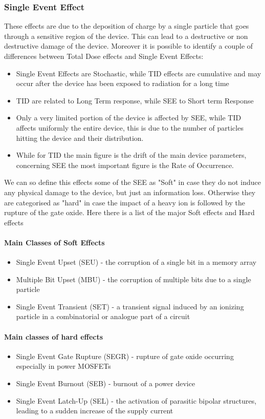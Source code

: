 \documentclass[./dissertation.tex]{subfiles}
\begin{document}
\subsubsection{Single Event Effect}
These effects are due to the deposition of charge by a single particle that goes through a sensitive region of the device. This can lead to a destructive or non destructive damage of the device.
Moreover it is possible to identify a couple of differences between Total Dose effects and Single Event Effects:
\begin{itemize}
    \item Single Event Effects are Stochastic, while TID effects are cumulative and may occur after the device has been exposed to radiation for a long time
    \item TID are related to Long Term response, while SEE to Short term Response
    \item Only a very limited portion of the device is affected by SEE, while TID affects uniformly the entire device, this is due to the number of particles hitting the device and their distribution.
    \item While for TID the main figure is the drift of the main device parameters, concerning SEE the most important figure is the Rate of Occurrence.
\end{itemize}

We can so define this effects some of the SEE as "Soft" in case they do not induce any physical damage to the device, but just an information loss. Otherwise they are categorised as "hard" in case the impact of a heavy ion is followed by the rupture of the gate oxide. Here there is a list of the major Soft effects and Hard effects
\paragraph{Main Classes of Soft Effects}
\begin{itemize}
    \item Single Event Upset (SEU) - the corruption of a single bit in a memory array
    \item Multiple Bit Upset (MBU) - the corruption of multiple bits due to a single particle
    \item Single Event Transient (SET) - a transient signal induced by an ionizing particle in a combinatorial or analogue part of a circuit
\end{itemize}
\paragraph{Main classes of hard effects}
\begin{itemize}
    \item Single Event Gate Rupture (SEGR) - rupture of gate oxide occurring especially in power MOSFETs
    \item Single Event Burnout (SEB) - burnout of a power device
    \item Single Event Latch-Up (SEL) - the activation of parasitic bipolar structures, leading to a sudden increase of the supply current
\end{itemize}
\end{document}
